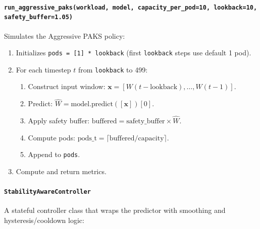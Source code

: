 \paragraph{\texttt{run\_aggressive\_paks(workload, model, capacity\_per\_pod=10, lookback=10, safety\_buffer=1.05)}}
Simulates the Aggressive PAKS policy:
\begin{enumerate}
  \item Initializes \texttt{pods = [1] * lookback} (first \texttt{lookback} steps use default 1 pod).
  \item For each timestep $t$ from \texttt{lookback} to 499:
  \begin{enumerate}
    \item Construct input window: $\mathbf{x} = [W(t-\text{lookback}), \ldots, W(t-1)]$.
    \item Predict: $\hat{W} = \text{model.predict}([\mathbf{x}])[0]$.
    \item Apply safety buffer: $\text{buffered} = \text{safety\_buffer} \times \hat{W}$.
    \item Compute pods: $\text{pods\_t} = \lceil \text{buffered} / \text{capacity} \rceil$.
    \item Append to \texttt{pods}.
  \end{enumerate}
  \item Compute and return metrics.
\end{enumerate}

\paragraph{\texttt{StabilityAwareController}}
A stateful controller class that wraps the predictor with smoothing and hysteresis/cooldown logic:

